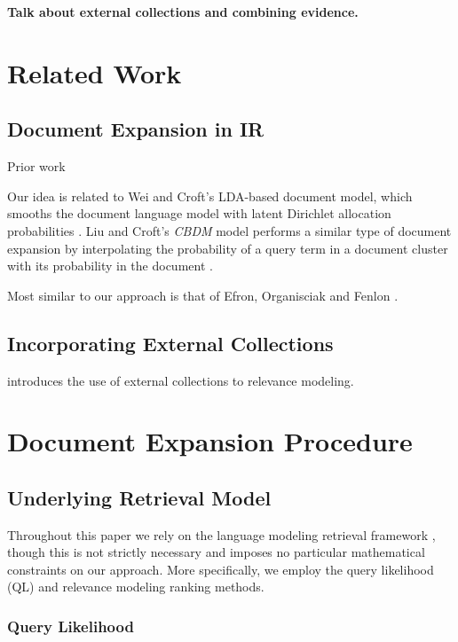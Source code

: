 \documentclass{article}
\begin{document}
\textbf{Talk about external collections and combining evidence.}

\section{Related Work}\label{section.related}

\subsection{Document Expansion in IR}\label{section.related.ir}

Prior work

Our idea is related to Wei and Croft's LDA-based document model, which smooths the document language model with latent Dirichlet allocation probabilities \cite{Wei2006}. Liu and Croft's \textit{CBDM} model performs a similar type of document expansion by interpolating the probability of a query term in a document cluster with its probability in the document \cite{Liu2004}.

Most similar to our approach is that of Efron, Organisciak and Fenlon \cite{Efron2012}.

\subsection{Incorporating External Collections}\label{section.external.collections}

\cite{Diaz2006} introduces the use of external collections to relevance modeling.

\section{Document Expansion Procedure}\label{section.expanding}

\subsection{Underlying Retrieval Model}\label{section.expanding.model}
Throughout this paper we rely on the language modeling retrieval framework \cite{Lafferty2001}, though this is not strictly necessary and imposes no particular mathematical constraints on our approach. More specifically, we employ the query likelihood (QL) and relevance modeling ranking methods. 

\subsubsection{Query Likelihood}\label{section.expanding.model.ql}
\end{document}
